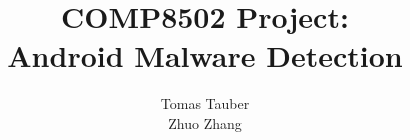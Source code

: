 \documentclass[a4paper]{report}
\begin{document}
\title{COMP8502 Project: \protect\\
Android Malware Detection}
\author{Tomas Tauber\protect\\
Zhuo Zhang}
\setcounter{secnumdepth}{-1} 
\date{}

\maketitle








{}

\end{document}
